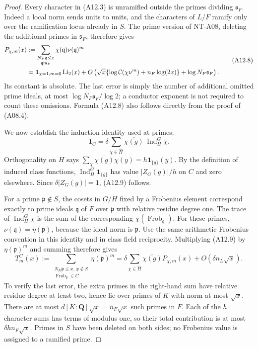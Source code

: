\begin{proof}
Every character in (A12.3) is unramified outside the primes
dividing \(\mathfrak s_F\). Indeed a local norm sends units
to units, and the characters of \(L/F\) ramify only over the
ramification locus already in \(S\). The prime version of
NT-A08, deleting the additional primes in \(\mathfrak s_F\),
therefore gives
\[
 \begin{split}
 P_{\chi,m}(x)
  &:=
    \sum_{\substack{N_F\mathfrak q\le x\\
                      \mathfrak q\nmid\mathfrak s_F}}
                 \chi(\mathfrak q)\nu(\mathfrak q)^m\\
  &=\mathbf1_{\chi=1,m=0}\operatorname{Li}_2(x)
    +O\left(\sqrt x\{\log{\cal C}(\chi\nu^m)
                       +n_F\log(2x)\}
                   +\log N_F\mathfrak s_F\right).
 \end{split}                                                   \tag{A12.8}
\]
Its constant is absolute. The last error is simply the
number of additional omitted prime ideals, at most
\(\log N_F\mathfrak s_F/\log2\); a conductor exponent is
not required to count these omissions. Formula (A12.8)
also follows directly from the proof of (A08.4).

We now establish the induction identity used at primes:
\[
       \mathbf1_C
       =\delta\sum_{\chi\in\widehat H}
                         \overline{\chi(g)}\,
                            \operatorname{Ind}_H^G\chi .
                                                               \tag{A12.9}
\]
Orthogonality on \(H\) says
\(\sum_\chi\overline{\chi(g)}\chi(y)=h\mathbf1_{\{g\}}(y)\).
By the definition of induced class functions,
\(\operatorname{Ind}_H^G\mathbf1_{\{g\}}\) has value
\(|Z_G(g)|/h\) on \(C\) and zero elsewhere. Since
\(\delta |Z_G(g)|=1\), (A12.9) follows.

For a prime \(\mathfrak p\notin S\), the cosets in \(G/H\)
fixed by a Frobenius element correspond exactly to prime
ideals \(\mathfrak q\) of \(F\) over \(\mathfrak p\) with
relative residue degree one. The trace of
\(\operatorname{Ind}_H^G\chi\) is the sum of the corresponding
\(\chi(\operatorname{Frob}_{\mathfrak q})\).
For these primes,
\(\nu(\mathfrak q)=\eta(\mathfrak p)\), because the ideal
norm is \(\mathfrak p\). Use the same arithmetic Frobenius
convention in this identity and in class field reciprocity.
Multiplying (A12.9) by \(\eta(\mathfrak p)^m\) and summing
therefore gives
\[
 T_m^C(x):=
 \sum_{\substack{N_K\mathfrak p\le x,\ \mathfrak p\notin S\\
                  \operatorname{Frob}_{\mathfrak p}\in C}}
                        \eta(\mathfrak p)^m
 =\delta\sum_{\chi\in\widehat H}
              \overline{\chi(g)}P_{\chi,m}(x)
           +O(\delta n_L\sqrt x).                       \tag{A12.10}
\]
To verify the last error, the extra primes in the right-hand
sum have relative residue degree at least two, hence lie
over primes of \(K\) with norm at most \(\sqrt x\).
There are at most \(d[K:\mathbf Q]\sqrt x=n_F\sqrt x\)
such primes in \(F\). Each of the \(h\) character sums has
terms of modulus one, so their total contribution is at
most \(\delta h n_F\sqrt x\). Primes in \(S\) have been
deleted on both sides; no Frobenius value is assigned to
a ramified prime.


\end{proof}
